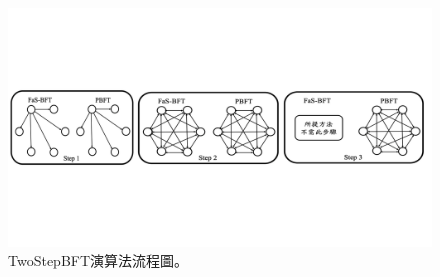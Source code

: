 \begin{figure}
\centering
\includegraphics[scale=0.45]{images/31.png}
\caption{TwoStepBFT演算法流程圖。}
\label{i:byz-latency}
\end{figure}